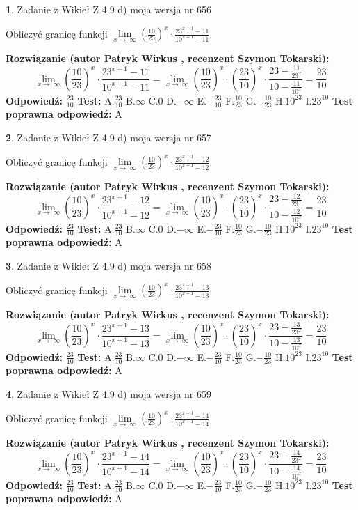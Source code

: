 \documentclass[12pt, a4paper]{article}
\theoremstyle{definition} %
\newtheorem{zad}{}
\newcommand{\zadStart}[1]{\begin{zad}#1\newline}
\newcommand{\zadStop}{\end{zad}}
\newcommand{\rozwStart}[2]{\noindent \textbf{Rozwiązanie (autor #1 , recenzent #2): }\newline}
\newcommand{\rozwStop}{\newline}
\newcommand{\odpStart}{\noindent \textbf{Odpowiedź:}\newline}
\newcommand{\odpStop}{\newline}
\newcommand{\testStart}{\noindent \textbf{Test:}\newline}
\newcommand{\testStop}{\newline}
\newcommand{\kluczStart}{\noindent \textbf{Test poprawna odpowiedź:}\newline}
\newcommand{\kluczStop}{\newline}
\begin{document}
\zadStart{Zadanie z Wikieł Z 4.9 d) moja wersja nr 656}


Obliczyć granicę funkcji  $\lim\limits_{x\to\ \infty}(\frac{10}{23})^{x}\cdot\frac{23^{x+1}-11}{10^{x+1}-11}$.
\zadStop
\rozwStart{Patryk Wirkus}{Szymon Tokarski}
$$\lim\limits_{x\to\ \infty}(\frac{10}{23})^{x}\cdot\frac{23^{x+1}-11}{10^{x+1}-11}=\lim\limits_{x\to\ \infty}(\frac{10}{23})^{x}\cdot(\frac{23}{10})^{x} \cdot \frac{23-\frac{11}{23^{x}}}{10-\frac{11}{10^{x}}} = \frac{23}{10}$$
\rozwStop
\odpStart
$\frac{23}{10}$
\odpStop
\testStart
A.$\frac{23}{10}$ B.$\infty$ C.$0$ D.$-\infty$ E.$-\frac{23}{10}$
F.$\frac{10}{23}$ G.$-\frac{10}{23}$
H.$10^{23}$
I.$23^{10}$
\testStop
\kluczStart
A
\kluczStop



\zadStart{Zadanie z Wikieł Z 4.9 d) moja wersja nr 657}


Obliczyć granicę funkcji  $\lim\limits_{x\to\ \infty}(\frac{10}{23})^{x}\cdot\frac{23^{x+1}-12}{10^{x+1}-12}$.
\zadStop
\rozwStart{Patryk Wirkus}{Szymon Tokarski}
$$\lim\limits_{x\to\ \infty}(\frac{10}{23})^{x}\cdot\frac{23^{x+1}-12}{10^{x+1}-12}=\lim\limits_{x\to\ \infty}(\frac{10}{23})^{x}\cdot(\frac{23}{10})^{x} \cdot \frac{23-\frac{12}{23^{x}}}{10-\frac{12}{10^{x}}} = \frac{23}{10}$$
\rozwStop
\odpStart
$\frac{23}{10}$
\odpStop
\testStart
A.$\frac{23}{10}$ B.$\infty$ C.$0$ D.$-\infty$ E.$-\frac{23}{10}$
F.$\frac{10}{23}$ G.$-\frac{10}{23}$
H.$10^{23}$
I.$23^{10}$
\testStop
\kluczStart
A
\kluczStop



\zadStart{Zadanie z Wikieł Z 4.9 d) moja wersja nr 658}


Obliczyć granicę funkcji  $\lim\limits_{x\to\ \infty}(\frac{10}{23})^{x}\cdot\frac{23^{x+1}-13}{10^{x+1}-13}$.
\zadStop
\rozwStart{Patryk Wirkus}{Szymon Tokarski}
$$\lim\limits_{x\to\ \infty}(\frac{10}{23})^{x}\cdot\frac{23^{x+1}-13}{10^{x+1}-13}=\lim\limits_{x\to\ \infty}(\frac{10}{23})^{x}\cdot(\frac{23}{10})^{x} \cdot \frac{23-\frac{13}{23^{x}}}{10-\frac{13}{10^{x}}} = \frac{23}{10}$$
\rozwStop
\odpStart
$\frac{23}{10}$
\odpStop
\testStart
A.$\frac{23}{10}$ B.$\infty$ C.$0$ D.$-\infty$ E.$-\frac{23}{10}$
F.$\frac{10}{23}$ G.$-\frac{10}{23}$
H.$10^{23}$
I.$23^{10}$
\testStop
\kluczStart
A
\kluczStop



\zadStart{Zadanie z Wikieł Z 4.9 d) moja wersja nr 659}


Obliczyć granicę funkcji  $\lim\limits_{x\to\ \infty}(\frac{10}{23})^{x}\cdot\frac{23^{x+1}-14}{10^{x+1}-14}$.
\zadStop
\rozwStart{Patryk Wirkus}{Szymon Tokarski}
$$\lim\limits_{x\to\ \infty}(\frac{10}{23})^{x}\cdot\frac{23^{x+1}-14}{10^{x+1}-14}=\lim\limits_{x\to\ \infty}(\frac{10}{23})^{x}\cdot(\frac{23}{10})^{x} \cdot \frac{23-\frac{14}{23^{x}}}{10-\frac{14}{10^{x}}} = \frac{23}{10}$$
\rozwStop
\odpStart
$\frac{23}{10}$
\odpStop
\testStart
A.$\frac{23}{10}$ B.$\infty$ C.$0$ D.$-\infty$ E.$-\frac{23}{10}$
F.$\frac{10}{23}$ G.$-\frac{10}{23}$
H.$10^{23}$
I.$23^{10}$
\testStop
\kluczStart
A
\kluczStop
\end{document}
